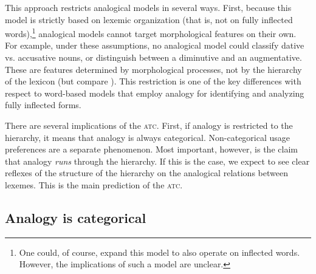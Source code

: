 This approach restricts analogical models in several ways. First, because this model is strictly based on lexemic organization (that is, not on fully inflected words),\footnote{One could, of course, expand this model to also operate on inflected words. However, the implications of such a model are unclear.} analogical models cannot target morphological features on their own. For example, under these assumptions, no analogical model could classify dative vs. accusative nouns, or distinguish between a diminutive and an augmentative. These are features determined by morphological processes, not by the hierarchy of the lexicon (but compare \citealt{Koenig.1999}). This restriction is one of the key differences with respect to word-based models that employ analogy for identifying and analyzing fully inflected forms.

There are several implications of the \textsc{atc}. First, if analogy is restricted to the hierarchy, it means that analogy is always categorical. Non-categorical usage preferences are a separate phenomenon. Most important, however, is the claim that analogy \textit{runs} through the hierarchy. If this is the case, we expect to see clear reflexes of the structure of the hierarchy on the analogical relations between lexemes. This is the main prediction of the \textsc{atc}.

\subsection{Analogy is categorical}

